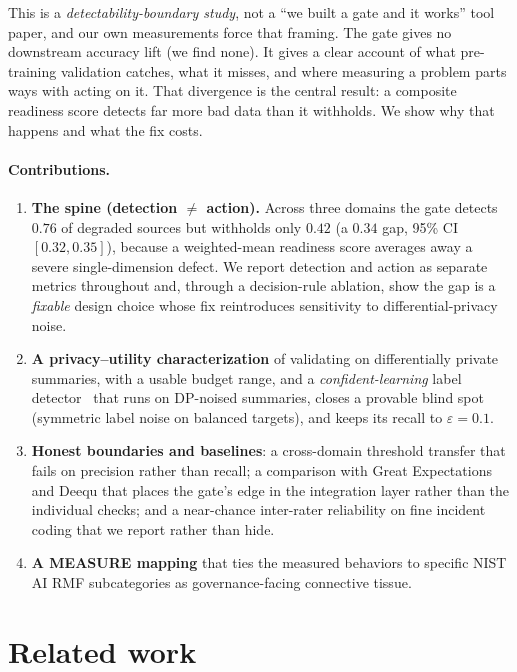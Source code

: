 \documentclass[11pt]{article}
\begin{document}
This is a \emph{detectability-boundary study}, not a ``we built a gate and it
works'' tool paper, and our own measurements force that framing. The gate gives no
downstream accuracy lift (we find none). It gives a clear account of what
pre-training validation catches, what it misses, and where measuring a problem
parts ways with acting on it. That divergence is the central result: a composite
readiness score detects far more bad data than it withholds. We show why that
happens and what the fix costs.

\paragraph{Contributions.}
\begin{enumerate}
\item \textbf{The spine (detection $\neq$ action).} Across three domains the gate
  detects $0.76$ of degraded sources but withholds only $0.42$ (a $0.34$ gap, 95\%
  CI $[0.32,0.35]$), because a weighted-mean readiness score averages away a severe
  single-dimension defect. We report detection and action as separate metrics
  throughout and, through a decision-rule ablation, show the gap is a \emph{fixable}
  design choice whose fix reintroduces sensitivity to differential-privacy noise.
\item \textbf{A privacy--utility characterization} of validating on differentially
  private summaries, with a usable budget range, and a \emph{confident-learning}
  label detector~\citep{northcutt2021confidentlearning} that runs on DP-noised
  summaries, closes a provable blind spot (symmetric label noise on balanced
  targets), and keeps its recall to $\varepsilon{=}0.1$.
\item \textbf{Honest boundaries and baselines}: a cross-domain threshold transfer
  that fails on precision rather than recall; a comparison with Great Expectations
  and Deequ that places the gate's edge in the integration layer rather than the
  individual checks; and a near-chance inter-rater reliability on fine incident
  coding that we report rather than hide.
\item \textbf{A MEASURE mapping} that ties the measured behaviors to specific NIST
  AI RMF subcategories as governance-facing connective tissue.
\end{enumerate}

\section{Related work}\label{sec:related}
\end{document}
